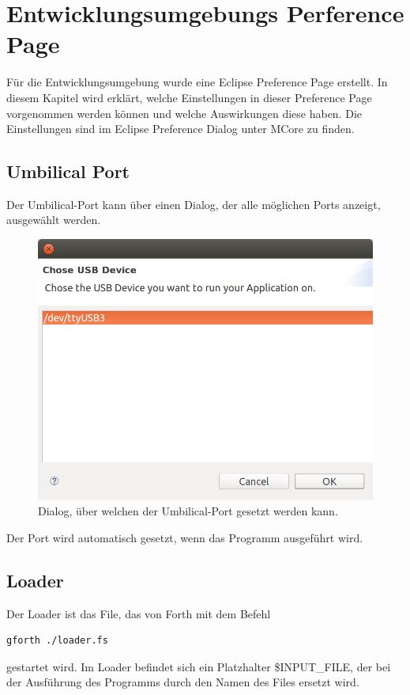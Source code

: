 \chapter{Entwicklungsumgebungs Perference Page}
\label{chap:settings}
Für die Entwicklungsumgebung wurde eine Eclipse Preference Page erstellt. In diesem Kapitel wird erklärt, welche Einstellungen in dieser Preference Page vorgenommen werden können und welche Auswirkungen diese haben. Die Einstellungen sind im Eclipse Preference Dialog unter MCore zu finden.
\section{Umbilical Port}

Der Umbilical-Port kann über einen Dialog, der alle möglichen Ports anzeigt, ausgewählt werden.

\begin{figure}[H]
	\centering
		\includegraphics[scale=0.3]{idesettings/umbilical.png}
		\caption{Dialog, über welchen der Umbilical-Port gesetzt werden kann.}
		\label{fig:umbilicalport}
\end{figure}

Der Port wird automatisch gesetzt, wenn das Programm ausgeführt wird. 

\section{Loader}

Der Loader ist das File, das von Forth mit dem Befehl
%
\begin{verbatim}
gforth ./loader.fs
\end{verbatim}
%
gestartet wird. Im Loader befindet sich ein Platzhalter \$INPUT\_FILE, der bei der Ausführung des Programms durch den Namen des Files ersetzt wird.